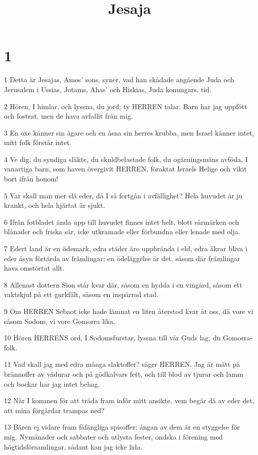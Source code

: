 

\title{Jesaja}


\chapter{1}

\par 1 Detta är Jesajas, Amos' sons, syner, vad han skådade angående Juda och Jerusalem i Ussias, Jotams, Ahas' och Hiskias, Juda konungars, tid.
\par 2 Hören, I himlar, och lyssna, du jord; ty HERREN talar. Barn har jag uppfött och fostrat, men de hava avfallit från mig.
\par 3 En oxe känner sin ägare och en åsna sin herres krubba, men Israel känner intet, mitt folk förstår intet.
\par 4 Ve dig, du syndiga släkte, du skuldbelastade folk, du ogärningsmäns avföda, I vanartiga barn, som haven övergivit HERREN, föraktat Israels Helige och vikit bort ifrån honom!
\par 5 Var skall man mer slå eder, då I så fortgån i avfällighet? Hela huvudet är ju krankt, och hela hjärtat är sjukt.
\par 6 Ifrån fotbladet ända upp till huvudet finnes intet helt, blott sårmärken och blånader och friska sår, icke utkramade eller förbundna eller lenade med olja.
\par 7 Edert land är en ödemark, edra städer äro uppbrända i eld, edra åkrar bliva i eder åsyn förtärda av främlingar; en ödeläggelse är det, såsom där främlingar hava omstörtat allt.
\par 8 Allenast dottern Sion står kvar där, såsom en hydda i en vingård, såsom ett vaktskjul på ett gurkfält, såsom en inspärrad stad.
\par 9 Om HERREN Sebaot icke hade lämnat en liten återstod kvar åt oss, då vore vi såsom Sodom, vi vore Gomorra lika.
\par 10 Hören HERRENS ord, I Sodomsfurstar, lyssna till vår Guds lag, du Gomorra-folk.
\par 11 Vad skall jag med edra många slaktoffer? säger HERREN. Jag är mätt på brännoffer av vädurar och på gödkalvars fett, och till blod av tjurar och lamm och bockar har jag intet behag.
\par 12 När I kommen för att träda fram inför mitt ansikte, vem begär då av eder det, att mina förgårdar trampas ned?
\par 13 Bären ej vidare fram fåfängliga spisoffer; ångan av dem är en styggelse för mig. Nymånader och sabbater och utlysta fester, ondska i förening med högtidsförsamlingar, sådant kan jag icke lida.
